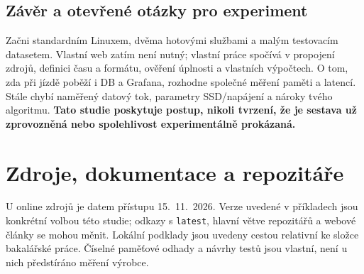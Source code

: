 \documentclass[11pt,a4paper]{article}
\begin{document}
\subsection{Závěr a otevřené otázky pro experiment}
Začni standardním Linuxem, dvěma hotovými službami a malým testovacím datasetem. Vlastní web zatím není nutný; vlastní práce spočívá v propojení zdrojů, definici času a formátu, ověření úplnosti a vlastních výpočtech. O tom, zda při jízdě poběží i DB a Grafana, rozhodne společné měření paměti a latencí. Stále chybí naměřený datový tok, parametry SSD/napájení a nároky tvého algoritmu. \textbf{Tato studie poskytuje postup, nikoli tvrzení, že je sestava už zprovozněná nebo spolehlivost experimentálně prokázaná.}

\clearpage
\section*{Zdroje, dokumentace a repozitáře}
U online zdrojů je datem přístupu 15.~11.~2026. Verze uvedené v příkladech jsou konkrétní volbou této studie; odkazy s \texttt{latest}, hlavní větve repozitářů a webové články se mohou měnit. Lokální podklady jsou uvedeny cestou relativní ke složce bakalářské práce. Číselné paměťové odhady a návrhy testů jsou vlastní, není u nich předstíráno měření výrobce.
\end{document}
